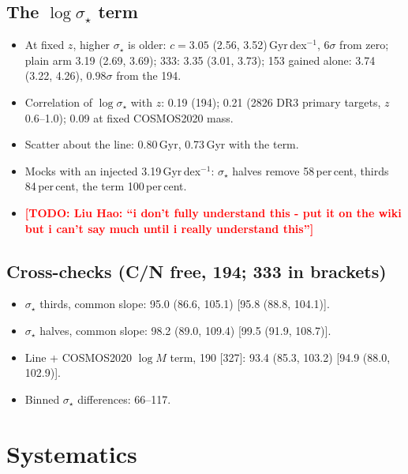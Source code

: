 \documentclass[fleqn,usenatbib]{mnras}
\newcommand{\todo}[1]{\textcolor{red}{\textbf{[TODO: #1]}}}
\newcommand{\sig}{\ensuremath{\sigma_\star}}
\begin{document}
\subsection{The $\log\sig$ term}
\begin{itemize}
\item At fixed $z$, higher \sig{} is older: $c = 3.05$ (2.56, 3.52)\,Gyr\,dex$^{-1}$, $6\sigma$ from zero; plain arm 3.19 (2.69, 3.69); 333: 3.35 (3.01, 3.73); 153 gained alone: 3.74 (3.22, 4.26), $0.98\sigma$ from the 194.
\item Correlation of $\log\sig$ with $z$: 0.19 (194); 0.21 (2826 DR3 primary targets, $z$ 0.6--1.0); 0.09 at fixed COSMOS2020 mass. 
\item Scatter about the line: 0.80\,Gyr, 0.73\,Gyr with the term.
\item Mocks with an injected 3.19\,Gyr\,dex$^{-1}$: \sig{} halves remove 58\,per\,cent, thirds 84\,per\,cent, the term 100\,per\,cent.
\item \todo{Liu Hao: ``i don't fully understand this - put it on the wiki but i can't say much until i really understand this''}
\end{itemize}

\subsection{Cross-checks (C/N free, 194; 333 in brackets)}
\begin{itemize}
\item \sig{} thirds, common slope: 95.0 (86.6, 105.1) [95.8 (88.8, 104.1)].
\item \sig{} halves, common slope: 98.2 (89.0, 109.4) [99.5 (91.9, 108.7)].
\item Line + COSMOS2020 $\log M$ term, 190 [327]: 93.4 (85.3, 103.2) [94.9 (88.0, 102.9)].
\item Binned \sig{} differences: 66--117. 
\end{itemize}

\section{Systematics}
\label{sec:syst}
\end{document}
